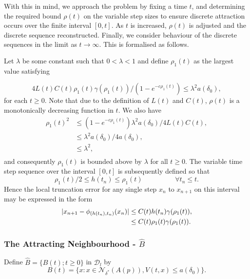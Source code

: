 With this in mind, we approach the problem by fixing a time $t$, and determining
the required bound $\rho(t)$ on the variable step sizes to ensure discrete
attraction occurs over the finite interval $[0, t]$. As $t$ is increased,
$\rho(t)$ is adjusted and the discrete sequence reconstructed. Finally, we
consider behaviour of the discrete sequences in the limit as $t \to \infty$.
This is formalised as follows.

Let $\lambda$ be some constant such that $0 <
\lambda < 1$ and define $\rho_1(t)$ as the largest value
satisfying

\begin{equation}\label{eqsdsrbnd1}
   4 L(t) C(t) \rho_1(t) \gamma(\rho_1(t)) / (1 - e^{-c\rho_1(t)}) \leq
      \lambda^2 a(\delta_0),
\end{equation}
for each $t \geq 0$. Note that due to the definition of $L(t)$ and $C(t)$,
$\rho(t)$ is a monotonically decreasing function in $t$. We also have
\begin{align*}
  \rho_1(t)^2 &\leq (1 - e^{-c\rho_1(t)}) \lambda^2 a(\delta_0) / 4 L(t) C(t),
             \\
    &\leq \lambda^2 a(\delta_0) / 4 a(\delta_0), \\
    &\leq \lambda^2, \\
\end{align*}
and consequently $\rho_1(t)$ is bounded above by $\lambda$ for all $t \geq 0$.
The variable time step sequence over the interval $[0, t]$ is subsequently
defined so that
 \begin{equation} \label{eqhsteps}
 \rho_1(t)/2 \leq h(t_n) \leq \rho_1(t) \hspace{2cm} \forall t_n \leq t.
\end{equation}
Hence the local truncation error for any single step $x_n$ to $x_{n+1}$
on this interval may be expressed in the form
\begin{align}
  | x_{n+1} - \phi_{(h(t_n), t_n)}(x_n)| &\leq C(t) h(t_n) \gamma(\rho_1(t)),
           \notag \label{eqsdsrbnd2} \\
  &\leq C(t) \rho_1(t) \gamma(\rho_1(t)).
\end{align}

\subsubsection{The Attracting Neighbourhood - $\hat{B}$}

\begin{defn}
Define $\hat{B} = \{B(t); t \geq 0 \}$ in $\mathcal{D}_l$ by
\[ B(t) = \{ x : x \in \mathcal{N}_{\delta^*}(A(p)), V(t, x) \leq a(\delta_0)
           \}. \]
\end{defn}

